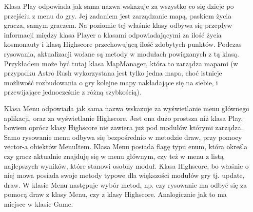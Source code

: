 Klasa Play odpowiada jak sama nazwa wskazuje za wszystko co się dzieje po przejściu z menu do gry. Jej zadaniem jest zarządzanie mapą, paskiem życia gracza, samym graczem. Na poziomie tej właśnie klasy odbywa się przepływ informacji między klasa Player a klasami odpowiadającymi za ilość życia kosmonauty i klasą Highscore przechowującą ilość zdobytych punktów. Podczas rysowania, aktualizacji wołane są metody w modułach powiązanych z tą klasą. Przykładem może być tutaj klasa MapManager, która to zarządza mapami (w przypadku Astro Rush wykorzystana jest tylko jedna mapa, choć istnieje możliwość rozbudowania o gry kolejne mapy nakładające się na siebie, i przewijające jednocześnie z różną szybkością).

Klasa Menu odpowiada jak sama nazwa wskazuje za wyświetlanie menu głównego aplikacji, oraz za wyświetlanie Highscore. Jest ona dużo prostsza niż klasa Play, bowiem oprócz klasy Highscore nie zawiera już pod modułów którymi zarządza. Samo rysowanie menu odbywa się bezpośrednio w metodzie draw, przy pomocy vector-a obiektów MenuItem. Klasa Menu posiada flagę typu enum, która określa czy gracz aktualnie znajduję się w menu głównym, czy też w menu z listą najlepszych wyników, które stanowi osobny moduł. Klasa Highscore, bo właśnie o niej mowa posiada swoje metody typowe dla większości modułów gry tj. update, draw. W klasie Menu następuje wybór metod, np. czy rysowanie ma odbyć się za pomocą draw z klasy Menu, czy z klasy Highscore. Analogicznie jak to ma miejsce w klasie Game.

